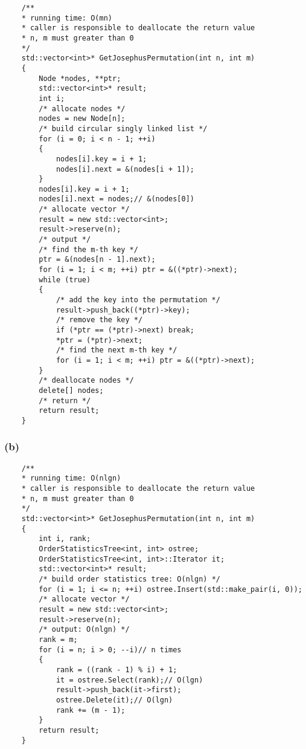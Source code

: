 \begin{verbatim}
    /**
    * running time: O(mn)
    * caller is responsible to deallocate the return value
    * n, m must greater than 0
    */
    std::vector<int>* GetJosephusPermutation(int n, int m)
    {
        Node *nodes, **ptr;
        std::vector<int>* result;
        int i;
        /* allocate nodes */
        nodes = new Node[n];
        /* build circular singly linked list */
        for (i = 0; i < n - 1; ++i)
        {
            nodes[i].key = i + 1;
            nodes[i].next = &(nodes[i + 1]);
        }
        nodes[i].key = i + 1;
        nodes[i].next = nodes;// &(nodes[0])
        /* allocate vector */
        result = new std::vector<int>;
        result->reserve(n);
        /* output */
        /* find the m-th key */
        ptr = &(nodes[n - 1].next);
        for (i = 1; i < m; ++i) ptr = &((*ptr)->next);
        while (true)
        {
            /* add the key into the permutation */
            result->push_back((*ptr)->key);
            /* remove the key */
            if (*ptr == (*ptr)->next) break;
            *ptr = (*ptr)->next;
            /* find the next m-th key */
            for (i = 1; i < m; ++i) ptr = &((*ptr)->next);
        }
        /* deallocate nodes */
        delete[] nodes;
        /* return */
        return result;
    }
\end{verbatim}

\subsubsection*{(b)}

\begin{verbatim}
    /**
    * running time: O(nlgn)
    * caller is responsible to deallocate the return value
    * n, m must greater than 0
    */
    std::vector<int>* GetJosephusPermutation(int n, int m)
    {
        int i, rank;
        OrderStatisticsTree<int, int> ostree;
        OrderStatisticsTree<int, int>::Iterator it;
        std::vector<int>* result;
        /* build order statistics tree: O(nlgn) */
        for (i = 1; i <= n; ++i) ostree.Insert(std::make_pair(i, 0));
        /* allocate vector */
        result = new std::vector<int>;
        result->reserve(n);
        /* output: O(nlgn) */
        rank = m;
        for (i = n; i > 0; --i)// n times
        {
            rank = ((rank - 1) % i) + 1;
            it = ostree.Select(rank);// O(lgn)
            result->push_back(it->first);
            ostree.Delete(it);// O(lgn)
            rank += (m - 1);
        }
        return result;
    }
\end{verbatim}


